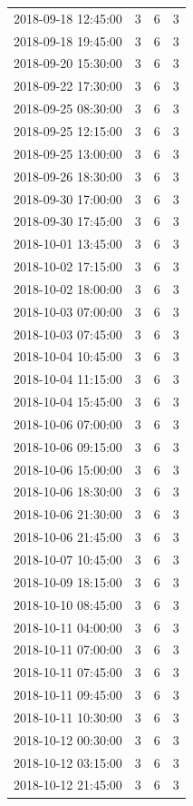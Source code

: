 \begin{tabular}{lrrr}
2018-09-18 12:45:00 & 3 & 6 & 3 \\
2018-09-18 19:45:00 & 3 & 6 & 3 \\
2018-09-20 15:30:00 & 3 & 6 & 3 \\
2018-09-22 17:30:00 & 3 & 6 & 3 \\
2018-09-25 08:30:00 & 3 & 6 & 3 \\
2018-09-25 12:15:00 & 3 & 6 & 3 \\
2018-09-25 13:00:00 & 3 & 6 & 3 \\
2018-09-26 18:30:00 & 3 & 6 & 3 \\
2018-09-30 17:00:00 & 3 & 6 & 3 \\
2018-09-30 17:45:00 & 3 & 6 & 3 \\
2018-10-01 13:45:00 & 3 & 6 & 3 \\
2018-10-02 17:15:00 & 3 & 6 & 3 \\
2018-10-02 18:00:00 & 3 & 6 & 3 \\
2018-10-03 07:00:00 & 3 & 6 & 3 \\
2018-10-03 07:45:00 & 3 & 6 & 3 \\
2018-10-04 10:45:00 & 3 & 6 & 3 \\
2018-10-04 11:15:00 & 3 & 6 & 3 \\
2018-10-04 15:45:00 & 3 & 6 & 3 \\
2018-10-06 07:00:00 & 3 & 6 & 3 \\
2018-10-06 09:15:00 & 3 & 6 & 3 \\
2018-10-06 15:00:00 & 3 & 6 & 3 \\
2018-10-06 18:30:00 & 3 & 6 & 3 \\
2018-10-06 21:30:00 & 3 & 6 & 3 \\
2018-10-06 21:45:00 & 3 & 6 & 3 \\
2018-10-07 10:45:00 & 3 & 6 & 3 \\
2018-10-09 18:15:00 & 3 & 6 & 3 \\
2018-10-10 08:45:00 & 3 & 6 & 3 \\
2018-10-11 04:00:00 & 3 & 6 & 3 \\
2018-10-11 07:00:00 & 3 & 6 & 3 \\
2018-10-11 07:45:00 & 3 & 6 & 3 \\
2018-10-11 09:45:00 & 3 & 6 & 3 \\
2018-10-11 10:30:00 & 3 & 6 & 3 \\
2018-10-12 00:30:00 & 3 & 6 & 3 \\
2018-10-12 03:15:00 & 3 & 6 & 3 \\
2018-10-12 21:45:00 & 3 & 6 & 3 \\

\end{tabular}
